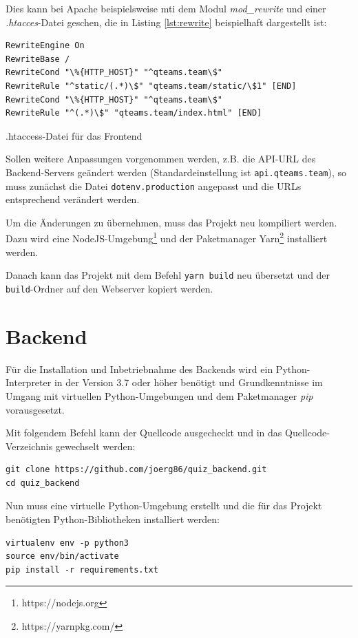 \documentclass[a4paper,11pt,listof=numbered,glossary=totoc,parskip=half,toc=bib]{scrreprt}
\begin{document}
\begin{appendices}
	Dies kann bei Apache beispielsweise mti dem Modul \textit{mod\_{}rewrite} und einer \textit{.htacces}-Datei geschen, die in Listing \ref{lst:rewrite} beispielhaft dargestellt ist:
	\begin{listing}
	\begin{verbatim}
RewriteEngine On
RewriteBase /
RewriteCond "\%{HTTP_HOST}" "^qteams.team\$" 
RewriteRule "^static/(.*)\$" "qteams.team/static/\$1" [END]
RewriteCond "\%{HTTP_HOST}" "^qteams.team\$" 
RewriteRule "^(.*)\$" "qteams.team/index.html" [END]
	\end{verbatim}
		\caption{.htaccess-Datei für das Frontend}
		\label{lst:rewrite}
	\end{listing}
	
	Sollen weitere Anpassungen vorgenommen werden, z.B. die API-URL des Backend-Servers geändert werden (Standardeinstellung ist \texttt{api.qteams.team}), so muss zunächst die Datei \texttt{dotenv.production} angepasst und die URLs entsprechend verändert werden.
	
	Um die Änderungen zu übernehmen, muss das Projekt neu kompiliert werden. Dazu wird eine NodeJS-Umgebung\footnote{https://nodejs.org} und der Paketmanager Yarn\footnote{https://yarnpkg.com/} installiert werden.
	
	Danach kann das Projekt mit dem Befehl \texttt{yarn build} neu übersetzt und der \texttt{build}-Ordner auf den Webserver kopiert werden.
	
	\section{Backend}
	Für die Installation und Inbetriebnahme des Backends wird ein Python-Interpreter in der Version 3.7 oder höher benötigt und Grundkenntnisse im Umgang mit virtuellen Python-Umgebungen und dem Paketmanager \textit{pip} vorausgesetzt.
	
	Mit folgendem Befehl kann der Quellcode ausgecheckt und in das Quellcode-Verzeichnis gewechselt werden:		
	\begin{verbatim}
git clone https://github.com/joerg86/quiz_backend.git
cd quiz_backend
	\end{verbatim}
	
	Nun muss eine virtuelle Python-Umgebung erstellt und die für das Projekt benötigten Python-Bibliotheken installiert werden:
	\begin{verbatim}
virtualenv env -p python3
source env/bin/activate
pip install -r requirements.txt
	\end{verbatim}
	

\end{appendices}
\end{document}
